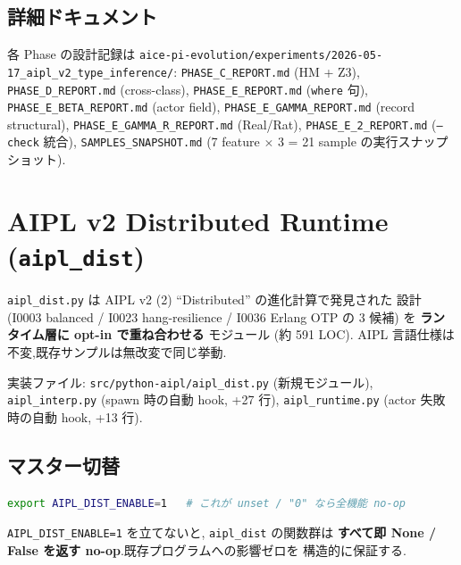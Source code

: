 \documentclass[11pt,a4paper]{article}
\begin{document}
\subsection{詳細ドキュメント}

各 Phase の設計記録は \texttt{aice-pi-evolution/experiments/2026-05-17\_aipl\_v2\_type\_inference/}:
\texttt{PHASE\_C\_REPORT.md} (HM + Z3),
\texttt{PHASE\_D\_REPORT.md} (cross-class),
\texttt{PHASE\_E\_REPORT.md} (\texttt{where} 句),
\texttt{PHASE\_E\_BETA\_REPORT.md} (actor field),
\texttt{PHASE\_E\_GAMMA\_REPORT.md} (record structural),
\texttt{PHASE\_E\_GAMMA\_R\_REPORT.md} (Real/Rat),
\texttt{PHASE\_E\_2\_REPORT.md} (\texttt{--check} 統合),
\texttt{SAMPLES\_SNAPSHOT.md} (7 feature $\times$ 3 = 21 sample の実行スナップショット).

\section{AIPL v2 Distributed Runtime (\texttt{aipl\_dist})}

\noindent{}


\texttt{aipl\_dist.py} は AIPL v2 (2) ``Distributed'' の進化計算で発見された
設計 (I0003 balanced / I0023 hang-resilience / I0036 Erlang OTP の 3 候補) を
\textbf{ランタイム層に opt-in で重ね合わせる} モジュール (約 591 LOC).
AIPL 言語仕様は不変,既存サンプルは無改変で同じ挙動.

実装ファイル: \texttt{src/python-aipl/aipl\_dist.py} (新規モジュール),
\texttt{aipl\_interp.py} (spawn 時の自動 hook, +27 行),
\texttt{aipl\_runtime.py} (actor 失敗時の自動 hook, +13 行).

\subsection{マスター切替}

\begin{lstlisting}[language=bash]
export AIPL_DIST_ENABLE=1   # これが unset / "0" なら全機能 no-op
\end{lstlisting}

\texttt{AIPL\_DIST\_ENABLE=1} を立てないと, \texttt{aipl\_dist} の関数群は
\textbf{すべて即 None / False を返す no-op}.既存プログラムへの影響ゼロを
構造的に保証する.
\end{document}

